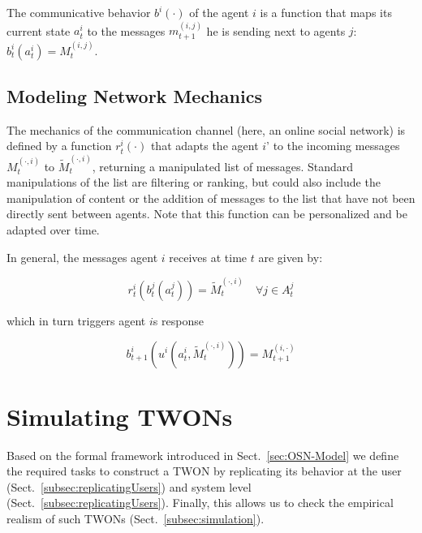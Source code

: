 The communicative behavior $b^i(\cdot)$ of the agent $i$ is a function that maps its current state $a_t^i$ to the messages $m_{t+1}^{(i,j)}$ he is sending next to agents $j$: $b^i_t(a_t^i) = M_{t}^{(i,j)}$.

\subsection{Modeling Network Mechanics}
\label{subsec:ModelingNetworks}
The mechanics of the communication channel (here, an online social network) is defined by a function $r^i_t(\cdot)$ that adapts the agent $i$' to the incoming messages $M_t^{(\cdot, i)}$ to $\widetilde{M}_t^{(\cdot, i)}$, returning a manipulated list of messages. Standard manipulations of the list are filtering or ranking, but could also include the manipulation of content or the addition of messages to the list that have not been directly sent between agents. Note that this function can be personalized and be adapted over time.

In general, the messages agent $i$ receives at time $t$ are given by:



$$ r_t^i( b^{j}_t(a_t^j)) = \widetilde{M}_{t}^{(\cdot, i)} \quad \forall j \in A_t^j  $$



which in turn triggers agent $i$s response 

$$ b^i_{t+1}( u^i(a^i_t, \widetilde{M}_{t}^{(\cdot, i)})) = M_{t+1}^{(i,\cdot)}$$

\section{Simulating TWONs}
\label{sec:replication}
Based on the formal framework introduced in Sect.~\ref{sec:OSN-Model} we define the required tasks to construct a TWON by replicating its behavior at the user (Sect.~\ref{subsec:replicatingUsers}) and system level (Sect.~\ref{subsec:replicatingUsers}). Finally, this allows us to check the empirical realism of such TWONs (Sect.~\ref{subsec:simulation}).

